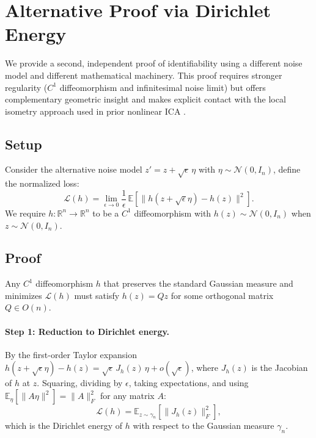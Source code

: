\section{Alternative Proof via Dirichlet Energy}\label{app:dirichlet}

We provide a second, independent proof of identifiability using a different noise model and different mathematical machinery. This proof requires stronger regularity ($C^1$ diffeomorphism and infinitesimal noise limit) but offers complementary geometric insight and makes explicit contact with the local isometry approach used in prior nonlinear ICA  \citep{buchholz2025robustness}.

\subsection{Setup}

Consider the alternative noise model $z' = z + \sqrt{\epsilon}\,\eta$ with $\eta \sim \mathcal{N}(0, I_n)$, define the normalized loss:
\begin{equation}
    \mathcal{L}(h) = \lim_{\epsilon \to 0} \frac{1}{\epsilon}\, \mathbb{E}\!\left[\|h(z + \sqrt{\epsilon}\eta) - h(z)\|^2\right].
\end{equation}
We require $h: \mathbb{R}^n \to \mathbb{R}^n$ to be a $C^1$ diffeomorphism with $h(z) \sim \mathcal{N}(0, I_n)$ when $z \sim \mathcal{N}(0, I_n)$.

\subsection{Proof}

\begin{theorembox}\label{thm:dirichlet}
Any $C^1$ diffeomorphism $h$ that preserves the standard Gaussian measure and minimizes $\mathcal{L}(h)$ must satisfy $h(z) = Qz$ for some orthogonal matrix $Q \in O(n)$.
\end{theorembox}


\paragraph{Step 1: Reduction to Dirichlet energy.}
By the first-order Taylor expansion $h(z + \sqrt{\epsilon}\eta) - h(z) = \sqrt{\epsilon}\, J_h(z)\,\eta + o(\sqrt{\epsilon})$, where $J_h(z)$ is the Jacobian of $h$ at $z$. Squaring, dividing by $\epsilon$, taking expectations, and using $\mathbb{E}_\eta[\|A\eta\|^2] = \|A\|_F^2$ for any matrix $A$:
\begin{equation}
    \mathcal{L}(h) = \mathbb{E}_{z \sim \gamma_n}\!\left[\|J_h(z)\|_F^2\right],
\end{equation}
which is the Dirichlet energy of $h$ with respect to the Gaussian measure $\gamma_n$.

